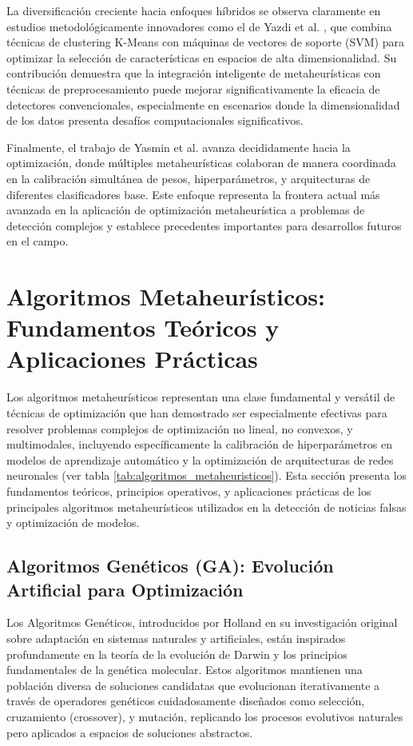 La diversificación creciente hacia enfoques híbridos se observa claramente en estudios metodológicamente innovadores como el de Yazdi et al. \cite{yazdi2020improving}, que combina técnicas de clustering K-Means con máquinas de vectores de soporte (SVM) para optimizar la selección de características en espacios de alta dimensionalidad. Su contribución demuestra que la integración inteligente de metaheurísticas con técnicas de preprocesamiento puede mejorar significativamente la eficacia de detectores convencionales, especialmente en escenarios donde la dimensionalidad de los datos presenta desafíos computacionales significativos.

Finalmente, el trabajo de Yasmin et al. \cite{yasmin2024ensemble} avanza decididamente hacia la optimización, donde múltiples metaheurísticas colaboran de manera coordinada en la calibración simultánea de pesos, hiperparámetros, y arquitecturas de diferentes clasificadores base. Este enfoque representa la frontera actual más avanzada en la aplicación de optimización metaheurística a problemas de detección complejos y establece precedentes importantes para desarrollos futuros en el campo.

\section{Algoritmos Metaheurísticos: Fundamentos Teóricos y Aplicaciones Prácticas}
\label{sec:algoritmos_metaheuristicos}

Los algoritmos metaheurísticos representan una clase fundamental y versátil de técnicas de optimización que han demostrado ser especialmente efectivas para resolver problemas complejos de optimización no lineal, no convexos, y multimodales, incluyendo específicamente la calibración de hiperparámetros en modelos de aprendizaje automático y la optimización de arquitecturas de redes neuronales (ver tabla \ref{tab:algoritmos_metaheuristicos}). Esta sección presenta los fundamentos teóricos, principios operativos, y aplicaciones prácticas de los principales algoritmos metaheurísticos utilizados en la detección de noticias falsas y optimización de modelos.

\subsection{Algoritmos Genéticos (GA): Evolución Artificial para Optimización}

Los Algoritmos Genéticos, introducidos por Holland \cite{holland1992adaptation} en su investigación original sobre adaptación en sistemas naturales y artificiales, están inspirados profundamente en la teoría de la evolución de Darwin y los principios fundamentales de la genética molecular. Estos algoritmos mantienen una población diversa de soluciones candidatas que evolucionan iterativamente a través de operadores genéticos cuidadosamente diseñados como selección, cruzamiento (crossover), y mutación, replicando los procesos evolutivos naturales pero aplicados a espacios de soluciones abstractos.

